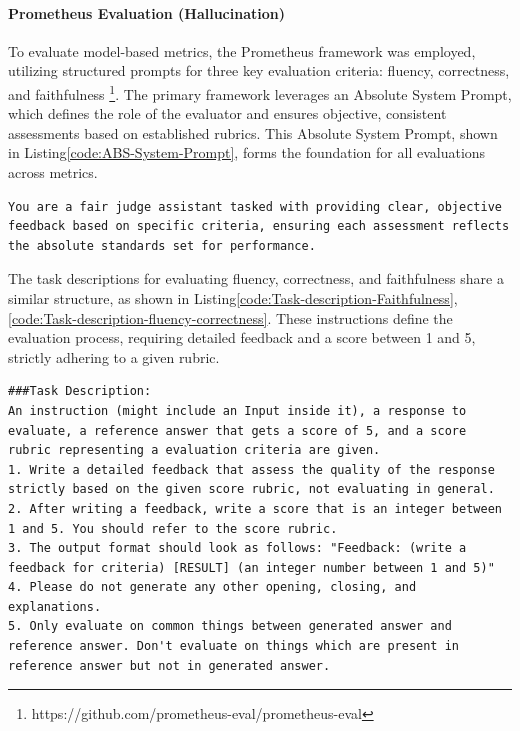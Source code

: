 \paragraph{Prometheus Evaluation (Hallucination)} 
\label{appendix:Prometheus}

To evaluate model-based metrics, the Prometheus framework \citep{kim2024prometheus2opensource} was employed, utilizing structured prompts for three key evaluation criteria: fluency, correctness, and faithfulness \footnote{https://github.com/prometheus-eval/prometheus-eval}. The primary framework leverages an Absolute System Prompt, which defines the role of the evaluator and ensures objective, consistent assessments based on established rubrics. This Absolute System Prompt, shown in Listing\ref{code:ABS-System-Prompt}, forms the foundation for all evaluations across metrics.

\begin{lstlisting}[style=textstyle, frame = single, caption=Absolute System Prompt \citep{kim2024prometheus2opensource}, label=code:ABS-System-Prompt]
You are a fair judge assistant tasked with providing clear, objective feedback based on specific criteria, ensuring each assessment reflects the absolute standards set for performance.
\end{lstlisting}
The task descriptions for evaluating fluency, correctness, and faithfulness share a similar structure, as shown in Listing\ref{code:Task-description-Faithfulness},\ref{code:Task-description-fluency-correctness}. These instructions define the evaluation process, requiring detailed feedback and a score between 1 and 5, strictly adhering to a given rubric.

\vspace{15pt}

\begin{lstlisting}[style=textstyle, frame = single, caption=Task description used for evaluation of faithfulness \citep{kim2024prometheus2opensource}, label=code:Task-description-Faithfulness]
###Task Description:
An instruction (might include an Input inside it), a response to evaluate, a reference answer that gets a score of 5, and a score rubric representing a evaluation criteria are given.
1. Write a detailed feedback that assess the quality of the response strictly based on the given score rubric, not evaluating in general.
2. After writing a feedback, write a score that is an integer between 1 and 5. You should refer to the score rubric.
3. The output format should look as follows: "Feedback: (write a feedback for criteria) [RESULT] (an integer number between 1 and 5)"
4. Please do not generate any other opening, closing, and explanations.
5. Only evaluate on common things between generated answer and reference answer. Don't evaluate on things which are present in reference answer but not in generated answer.
\end{lstlisting}

